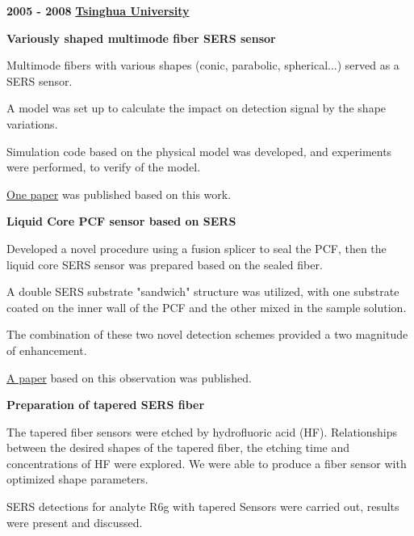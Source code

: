 \documentclass[10pt]{article}
\newenvironment{outerlist}[1][\enskip\textbullet]%
        {\begin{enumerate}[#1]}{\end{enumerate}%
         \vspace{-.6\baselineskip}}
\newenvironment{innerlist}[1][\enskip\textbullet]%
        {\begin{compactenum}[#1]}{\end{compactenum}}
\begin{document}
\textbf{2005 - 2008} \hfill \href{http://www.tsinghua.edu.cn}{\textbf{Tsinghua University}}
\begin{outerlist}
\item[] \textbf{Variously shaped multimode fiber SERS sensor}
        \begin{innerlist}
        \item Multimode fibers with various shapes (conic, parabolic, spherical...) served as a SERS sensor.
        \item A model was set up to calculate the impact on detection signal by the shape variations.
        \item Simulation code based on the physical model was developed, and experiments were performed, to verify of the model.
        \item \href{http://spie.org/x648.xml?product_id=791756&Search_Origin=QuickSearch&Search_Results_URL=http://spie.org/x1636.xml&Alternate_URL=http://spie.org/x18509.xml&Alternate_URL_Name=timeframe&Alternate_URL_Value=Exhibitors&UseJavascript=1&Please_Wait_URL=http://spie.org/x18503.xml&search_text=chao%20lu&category=All&go=submit}{One paper} was published based on this work.
        \end{innerlist}


\item[] \textbf{Liquid Core PCF sensor based on SERS}
        \begin{innerlist}
        \item Developed a novel procedure using a fusion splicer to seal the PCF, then the liquid core SERS sensor was prepared based on the sealed fiber.
        \item A double SERS substrate "sandwich" structure was utilized, with one substrate coated on the inner wall of the PCF and the other mixed in the sample solution.
        \item The combination of these two novel detection schemes provided a two magnitude of enhancement.
        \item \href{http://apl.aip.org/resource/1/applab/v93/i15/p153101_s1}{A paper} based on this observation was published.
        \end{innerlist}

\item[] \textbf{Preparation of tapered SERS fiber}
        \begin{innerlist}
          \item The tapered fiber sensors were etched by hydrofluoric acid (HF). Relationships between the desired shapes of the tapered fiber, the etching time and concentrations of HF were explored. We were able to produce a fiber sensor with optimized shape parameters.
          \item SERS detections for analyte R6g with tapered Sensors were carried out, results were present and discussed.
        \end{innerlist}


\end{outerlist}
\end{document}

